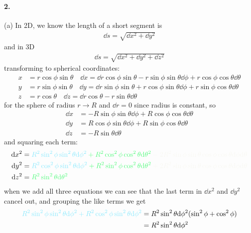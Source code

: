 \documentclass[../hw.tex]{subfiles}
\begin{document}
\paragraph*{2.} (a) In 2D, we know the length of a short segment is
\begin{align*}
    \dd s = \sqrt{\dd x^2 + \dd y^2} 
\end{align*}
and in 3D
\begin{align*}
    \dd s = \sqrt{\dd x^2 + \dd y^2 + \dd z^2}
\end{align*}
transforming to spherical coordinates:
\begin{align*}
    x &= r\cos\phi \sin\theta \quad \dd x = \dd r \cos\phi \sin\theta
        - r \sin\phi \sin\theta \dd \phi + r \cos\phi \cos\theta \dd \theta \\
    y &= r\sin\phi \sin\theta \quad \dd y = \dd r \sin\phi \sin\theta
        + r \cos\phi \sin\theta \dd \phi + r \sin\phi \cos\theta \dd \theta \\
    z &= r\cos\theta \quad \dd z = \dd r \cos\theta - r \sin\theta \dd \theta
\end{align*}
for the sphere of radius $r \to R$ and $\dd r = 0$ since radius is constant, so
\begin{align*}
    \dd x &= - R \sin\phi \sin\theta \dd \phi + R \cos\phi \cos\theta \dd \theta \\
    \dd y &= R \cos\phi \sin\theta \dd \phi + R \sin\phi \cos\theta \dd \theta \\
    \dd z &= - R \sin\theta \dd \theta
\end{align*}
and squaring each term:
\begin{align*}
    \dd x^2 &= \color{draculacyan} R^2 \sin^2\phi \sin^2\theta \dd\phi^2
        \color{draculagreen} + R^2 \cos^2\phi \cos^2\theta \dd\theta^2
        \color{draculafg} - 2R^2 \sin\phi \sin\theta \cos\phi \cos\theta \dd\phi\dd\theta \\  
    \dd y^2 &= \color{draculacyan} R^2 \cos^2\phi \sin^2\theta \dd\phi^2
        \color{draculagreen} + R^2 \sin^2\phi \cos^2\theta \dd\theta^2
        \color{draculafg}+ 2R^2 \sin\phi \sin\theta \cos\phi \cos\theta \dd\phi\dd\theta \\
    \dd z^2 &= \color{draculagreen} R^2 \sin^2\theta \dd\theta^2
\end{align*}
when we add all three equations we can see that the last term in $\dd x^2$ and $\dd y^2$ cancel out,
and grouping the like terms we get
\begin{align*}
    \color{draculacyan} R^2 \sin^2\phi \sin^2\theta \dd\phi^2 + R^2 \cos^2\phi \sin^2\theta \dd\phi^2
        &= R^2 \sin^2\theta \dd\phi^2 (\sin^2\phi + \cos^2\phi) \\
        &= R^2 \sin^2\theta \dd\phi^2
\end{align*}
\end{document}
